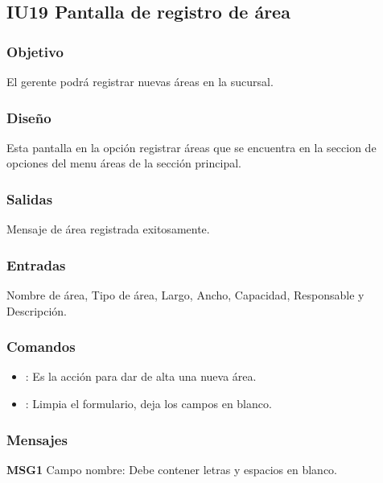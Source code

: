 \subsection{IU19 Pantalla de registro de área}

\subsubsection{Objetivo}
	El gerente podrá registrar nuevas áreas en la sucursal.

\subsubsection{Diseño}
	Esta pantalla en la opción registrar áreas que se encuentra en la seccion de opciones del menu áreas de la sección principal.


\subsubsection{Salidas}
Mensaje de área registrada exitosamente.

\subsubsection{Entradas}
Nombre de área, Tipo de área, Largo, Ancho, Capacidad, Responsable y Descripción.

\subsubsection{Comandos}
\begin{itemize}
	\item {}: Es la acción para dar de alta una nueva área.
	\item {}: Limpia el formulario, deja los campos en blanco.
\end{itemize}

\subsubsection{Mensajes}
	\begin{Citemize}
		\item {\bf MSG1} Campo nombre: Debe contener letras y espacios en blanco.
	\end{Citemize}
